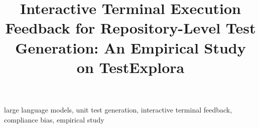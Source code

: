 \documentclass[conference]{IEEEtran}
\begin{document}
\title{Interactive Terminal Execution Feedback for Repository-Level Test Generation: An Empirical Study on TestExplora}
\author{
}

\maketitle

\begin{abstract}

\end{abstract}

\begin{IEEEkeywords}
large language models, unit test generation, interactive terminal feedback, compliance bias, empirical study
\end{IEEEkeywords}











\end{document}
